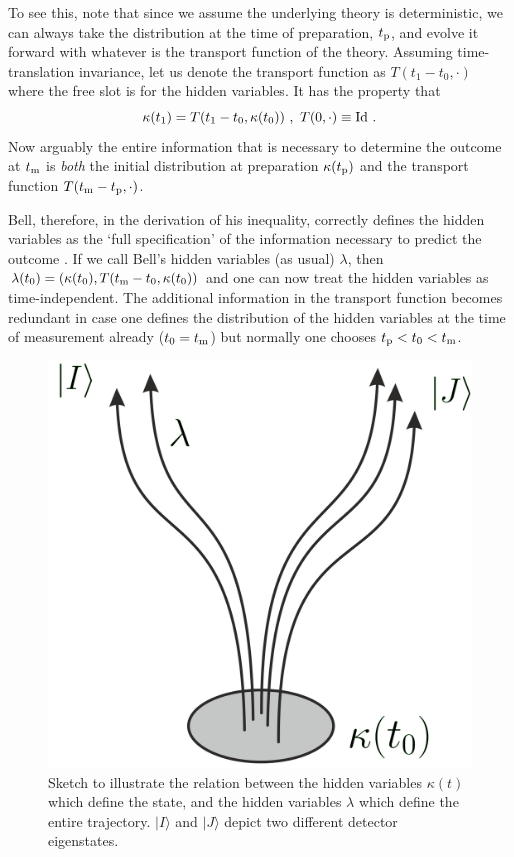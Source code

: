 \documentclass[superscriptaddress,twocolumn,floatfix,nofootinbib]{revtex4-2}
\begin{document}
To see this, note that since we assume the underlying theory is deterministic, we can always take the distribution at the time of preparation, $t_{\rm p}$, and evolve it forward with whatever is the transport function of the theory. Assuming time-translation invariance, let us denote the transport function as $T(t_1-t_0,\cdot)$ where the free slot is for the hidden variables. It has the property that
\begin{equation}
\kappa(t_1) = T(t_1-t_0,\kappa(t_0))~,~T(0,\cdot) \equiv {\rm Id}~.
\end{equation}
Now arguably the entire information that is necessary to determine the outcome at $t_{\rm m}$ is \emph{both} the initial distribution at preparation $\kappa(t_{\rm p})$ and the transport function $T(t_{\rm m}-t_{\rm p},\cdot)$.

Bell, therefore, in the derivation of his inequality, correctly defines the hidden variables as the `full specification' of the information necessary to predict the outcome \cite{Bell2004Speakable}. If we call Bell's hidden variables (as usual) $\lambda$, then $\lambda(t_0) = (\kappa (t_0),T(t_{\rm m}-t_0,\kappa(t_0))$ and one can now treat the hidden variables as time-independent. The additional information in the transport function becomes redundant in case one defines the distribution of the hidden variables at the time of measurement already ($t_0 = t_{\rm m}$) but normally one chooses $t_{\rm p}<t_0<t_{\rm m}$. 

\begin{figure}
    \centering
    \includegraphics[width=0.7\linewidth]{kappalambda.png}
    \caption{Sketch to illustrate the relation between the hidden variables $\kappa(t)$ which define the state, and the hidden variables $\lambda$ which define the entire trajectory. $|I \rangle$ and $|J\rangle$ depict two different detector eigenstates.}
    \label{fig:kappalambda}
\end{figure}
\end{document}
